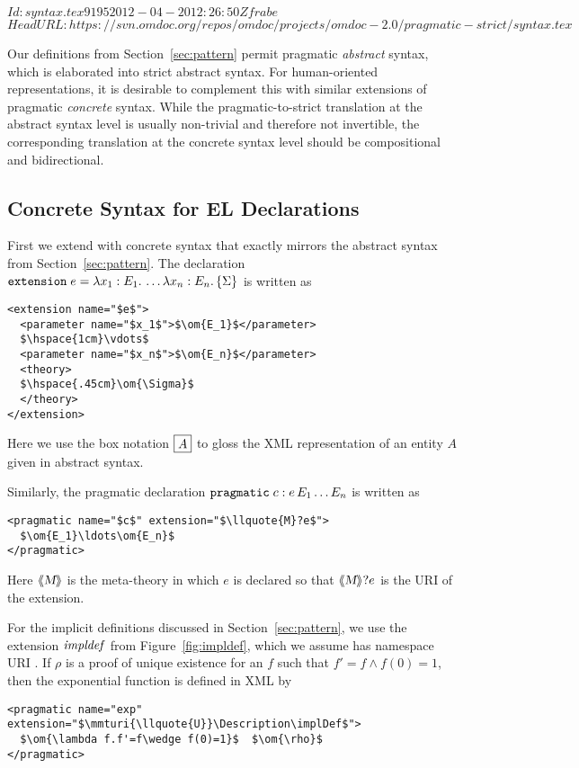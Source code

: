 \svnInfo $Id: syntax.tex 9195 2012-04-20 12:26:50Z frabe $
\svnKeyword $HeadURL: https://svn.omdoc.org/repos/omdoc/projects/omdoc-2.0/pragmatic-strict/syntax.tex $

Our definitions from Section~\ref{sec:pattern} permit pragmatic \emph{abstract} syntax,
which is elaborated into strict abstract syntax.  For human-oriented representations, it
is desirable to complement this with similar extensions of pragmatic \emph{concrete}
syntax.  While the pragmatic-to-strict translation at the abstract syntax level is usually
non-trivial and therefore not invertible, the corresponding translation at the concrete
syntax level should be compositional and bidirectional.

\subsection{\protect\omdoc Concrete Syntax for EL Declarations}\label{sec:omdoc-concrete}

First we extend {\omdoc} with concrete syntax that exactly mirrors the abstract syntax
from Section~\ref{sec:pattern}. The declaration $\mathtt{extension}\;e = \lambda x_1:E_1.\,\ldots\lambda x_n:E_n.\,\{\Sigma\}$
is written as
\begin{lstlisting}[mathescape,morekeywords={extension,parameter}]
<extension name="$e$">
  <parameter name="$x_1$">$\om{E_1}$</parameter>
  $\hspace{1cm}\vdots$
  <parameter name="$x_n$">$\om{E_n}$</parameter>
  <theory>
  $\hspace{.45cm}\om{\Sigma}$
  </theory>
</extension>
\end{lstlisting}
Here we use the box notation $\fbox{\ensuremath{A}}$ to gloss the XML representation of an entity $A$ given in abstract syntax.

Similarly, the pragmatic declaration $\mathtt{pragmatic}\;c:e\,E_1\ldots E_n$ is written as

\begin{lstlisting}[mathescape,morekeywords={pragmatic}]
<pragmatic name="$c$" extension="$\llquote{M}?e$">
  $\om{E_1}\ldots\om{E_n}$
</pragmatic>
\end{lstlisting}
Here $\langle\kern-.25em\langle\hbox{\sl{M}}\rangle\kern-.25em\rangle$ is the meta-theory in which $e$ is declared so that $\langle\kern-.25em\langle\hbox{\sl{M}}\rangle\kern-.25em\rangle?e$ is the {\mmt} URI of the extension.

\begin{example}
  For the implicit definitions discussed in Section~\ref{sec:pattern}, we use the extension
  $\mathit{impldef}$ from Figure~\ref{fig:impldef}, which we assume has namespace URI .
  If $\rho$ is a proof of unique existence for an $f$ such that $f'=f\wedge f(0)=1$, then the exponential function is defined in XML by

\begin{lstlisting}[mathescape,label=lst:expdef,morekeywords={pragmatic}]
<pragmatic name="exp" extension="$\mmturi{\llquote{U}}\Description\implDef$">
  $\om{\lambda f.f'=f\wedge f(0)=1}$  $\om{\rho}$
</pragmatic>
\end{lstlisting}
\end{example}

